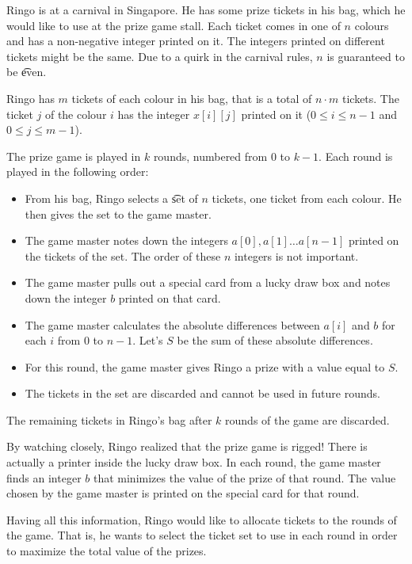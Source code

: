 Ringo is at a carnival in Singapore. He has some prize tickets in his bag, which he would like to use at the prize game stall. Each ticket comes in one of $n$ colours and has a non-negative integer printed on it. The integers printed on different tickets might be the same. Due to a quirk in the carnival rules, $n$ is guaranteed to be \t{even}. 

Ringo has $m$ tickets of each colour in his bag, that is a total of $n \cdot m$ tickets. The ticket $j$ of the colour $i$ has the integer $x[i][j]$ printed on it ($0 \leq i \leq n-1$ and $0 \leq j \leq m-1$).

The prize game is played in $k$ rounds, numbered from $0$ to $k-1$. Each round is played in the following order:
\begin{itemize}
\item From his bag, Ringo selects a \t{set} of $n$ tickets, one ticket from each colour. He then gives the set to the game master. 
\item The game master notes down the integers $a[0], a[1] \ldots a[n-1]$ printed on the tickets of the set. The order of these $n$ integers is not important.
\item The game master pulls out a special card from a lucky draw box and notes down the integer $b$ printed on that card.
\item The game master calculates the absolute differences between $a[i]$ and $b$ for each $i$ from $0$ to $n-1$. Let's $S$ be the sum of these absolute differences.
\item For this round, the game master gives Ringo a prize with a value equal to $S$.
\item The tickets in the set are discarded and cannot be used in future rounds.
\end{itemize}

The remaining tickets in Ringo's bag after $k$ rounds of the game are discarded. 

By watching closely, Ringo realized that the prize game is rigged! There is actually a printer inside the lucky draw box. In each round, the game master finds an integer $b$ that minimizes the value of the prize of that round. The value chosen by the game master is printed on the special card for that round.

Having all this information, Ringo would like to allocate tickets to the rounds of the game.
That is, he wants to select the ticket set to use in each round in order to maximize the total value of the prizes.

